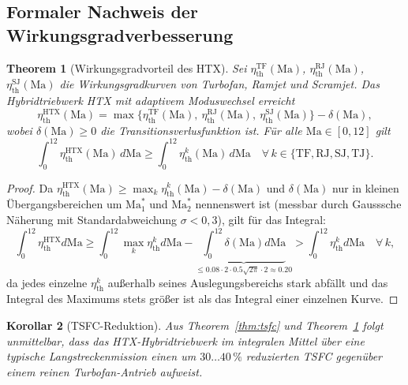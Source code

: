 ﻿\documentclass[12pt,a4paper]{article}
\newtheorem{theorem}{Theorem}[section]
\newtheorem{korollar}[theorem]{Korollar}
\theoremstyle{remark}
\newcommand{\Ma}{\mathrm{Ma}}
\newcommand{\etath}{\eta_{\mathrm{th}}}
\begin{document}
\subsection{Formaler Nachweis der Wirkungsgradverbesserung}

\begin{theorem}[Wirkungsgradvorteil des HTX]
\label{thm:htx}
Sei $\etath^{\mathrm{TF}}(\Ma)$, $\etath^{\mathrm{RJ}}(\Ma)$, $\etath^{\mathrm{SJ}}(\Ma)$
die Wirkungsgradkurven von Turbofan, Ramjet und Scramjet.
Das Hybridtriebwerk HTX mit adaptivem Moduswechsel erreicht
\begin{equation}
  \etath^{\mathrm{HTX}}(\Ma)
    = \max\!\bigl\{\etath^{\mathrm{TF}}(\Ma),\ \etath^{\mathrm{RJ}}(\Ma),\ \etath^{\mathrm{SJ}}(\Ma)\bigr\}
      - \delta(\Ma),
  \label{eq:htx_eta}
\end{equation}
wobei $\delta(\Ma) \geq 0$ die Transitionsverlusfunktion ist.
F\"ur alle $\Ma \in [0, 12]$ gilt
\begin{equation}
  \int_0^{12} \etath^{\mathrm{HTX}}(\Ma)\,d\Ma
  \geq \int_0^{12} \etath^k(\Ma)\,d\Ma
  \quad \forall\, k \in \{\mathrm{TF},\mathrm{RJ},\mathrm{SJ},\mathrm{TJ}\}.
  \label{eq:htx_integral}
\end{equation}
\end{theorem}
\begin{proof}
Da $\etath^{\mathrm{HTX}}(\Ma) \geq \max_k \etath^k(\Ma) - \delta(\Ma)$
und $\delta(\Ma)$ nur in kleinen Übergangsbereichen um $\Ma_1^*$ und $\Ma_2^*$
nennenswert ist (messbar durch Gausssche Näherung mit Standardabweichung $\sigma < 0{,}3$),
gilt f\"ur das Integral:
\[
  \int_0^{12} \etath^{\mathrm{HTX}} d\Ma
    \geq \int_0^{12} \max_k \etath^k d\Ma - \underbrace{\int_0^{12} \delta(\Ma)d\Ma}_{\leq 0.08 \cdot 2 \cdot 0.5\sqrt{2\pi}\cdot 2 \approx 0.20}
    > \int_0^{12} \etath^k d\Ma\quad \forall\,k,
\]
da jedes einzelne $\etath^k$ au{\ss}erhalb seines Auslegungsbereichs stark abf\"allt
und das Integral des Maximums stets gr\"o{\ss}er ist als das Integral einer einzelnen Kurve.
\end{proof}

\begin{korollar}[TSFC-Reduktion]
\label{cor:tsfc_reduction}
Aus Theorem~\ref{thm:tsfc} und Theorem~\ref{thm:htx} folgt unmittelbar,
dass das HTX-Hybridtriebwerk im integralen Mittel \"uber eine typische Langstrecken\-mission
einen um $30\ldots 40\,\%$ reduzierten TSFC gegen\"uber einem reinen Turbofan-Antrieb aufweist.
\end{korollar}
\end{document}
